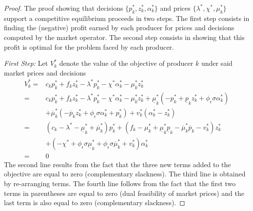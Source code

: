 \documentclass{article}
\begin{document}
\begin{proof}
The proof showing that decisions $\{p_k^*, z_k^*, \alpha_k^*\}$ and prices $\{\lambda^*, \chi^*, \mu_k^*\}$ support a competitive equilibrium proceeds in two steps. The first step consists in finding the (negative) profit earned by each producer for prices and decisions computed by the market operator. The second step consists in showing that this profit is optimal for the problem faced by each producer.

\textit{First Step:} Let $V_k^*$ denote the value of the objective of producer $k$ under said market prices and decisions
\begin{align}
    V_k^* =& c_k p_k^* + f_k z_k^* - \lambda^* p_k^* - \chi^* \alpha_k^* - \mu_k^* z_k^* \\
    =& c_k p_k^* + f_k z_k^* - \lambda^* p_k^* - \chi^* \alpha_k^* - \mu_k^* z_k^* + \underline{\mu}_k^*(-p_k^*  + \underline{p}_k z_k^* + \phi_{\epsilon} \sigma \alpha_k^*)\\
    & + \overline{\mu}_k^* (-\overline{p}_k z_k^* + \phi_{\epsilon} \sigma \alpha_k^* + p_k^*) + v_k^*(\alpha_k^* - z_k^*)\\
    =& (c_k - \lambda^* - \underline{\mu}_k^* + \overline{\mu}_k^*) p_k^*+ (f_k - \mu_k^* + \underline{\mu}_k^* \underline{p}_k - \overline{\mu}_k^* \overline{p}_k - v_k^*) z_k^*\\
    &+ (-\chi^* + \phi_{\epsilon} \sigma \underline{\mu}_k^* + \phi_{\epsilon} \sigma \overline{\mu}_k^* + v_k^*) \alpha_k^*\\
    =& 0
\end{align}
The second line results from the fact that the three new terms added to the objective are equal to zero (complementary slackness). The third line is obtained by re-arranging terms. The fourth line follows from the fact that the first two terms in parentheses are equal to zero (dual feasibility of market prices) and the last term is also equal to zero (complementary slackness).


\end{proof}
\end{document}
